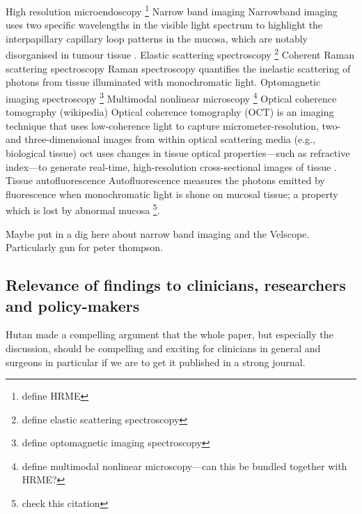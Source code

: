 High resolution microendoscopy \cite{vilap.m.DiscriminationBenignNeoplastic2012, milesb.a.OperativeMarginControl2015}\footnote{define HRME}
Narrow band imaging \cite{tirelliNarrowBandImaging2015, tirellig.TailoredResectionsOral2018}Narrowband imaging uses two specific wavelengths in the visible light spectrum to highlight the interpapillary capillary loop patterns in the mucosa, which are notably disorganised in tumour tissue \cite{vuEfficacyNarrowBand2014}.
Elastic scattering spectroscopy \cite{grilloneg.a.ColorCancerMargin2017}\footnote{define elastic scattering spectroscopy}
Coherent Raman scattering spectroscopy \cite{hoeslir.c.CoherentRamanScattering2017} Raman spectroscopy quantifies the inelastic scattering of photons from tissue illuminated with monochromatic light.
Optomagnetic imaging spectroscopy \cite{lisulb.PredictiveValueOptomagnetic2019}\footnote{define optomagnetic imaging spectroscopy} 
Multimodal nonlinear microscopy \cite{heukes.MultimodalNonlinearMicroscopy2016}\footnote{define multimodal nonlinear microscopy---can this be bundled together with HRME?} 
Optical coherence tomography (wikipedia) Optical coherence tomography (OCT) is an imaging technique that uses low-coherence light to capture micrometer-resolution, two- and three-dimensional images from within optical scattering media (e.g., biological tissue) \cite{hamdoonz.OpticalCoherenceTomography2016} \Gls{oct} uses changes in tissue optical properties---such as refractive index---to generate real-time, high-resolution cross-sectional images of tissue \cite{heidaria.e.UseOpticalCoherence2020}.
Tissue autofluorescence \cite{ohnishiy.UsefulnessFluorescenceVisualization2016} Autofluorescence measures the photons emitted by fluorescence when monochromatic light is shone on mucosal tissue; a property which is lost by abnormal mucosa \cite{leey.-j.IntraoperativeFluorescenceGuidedSurgery2020}\footnote{check this citation}.

Maybe put in a dig here about narrow band imaging and the Velscope. 
Particularly gun for peter thompson.

\subsection{Relevance of findings to clinicians, researchers and policy-makers}

Hutan made a compelling argument that the whole paper, but especially the discussion, should be compelling and exciting for clinicians in general and surgeons in particular if we are to get it published in a strong journal.


